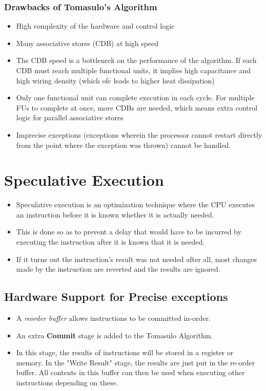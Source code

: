 \documentclass{article}
\begin{document}
\subsubsection{Drawbacks of Tomasulo's Algorithm}
\begin{itemize}
    \item High complexity of the hardware and control logic
    
    \item Many associative stores (CDB) at high speed
    
    \item The CDB speed is a bottleneck on the performance of the algorithm. If each CDB must reach multiple functional units, it implies high capacitance and high wiring density (which ofc leads to higher heat dissipation)
    
    \item Only one functional unit can complete execution in each cycle. For multiple FUs to complete at once, more CDBs are needed, which means extra control logic for parallel associative stores
    
    \item Imprecise exceptions (exceptions wherein the processor cannot restart directly from the point where the exception was thrown) cannot be handled.
\end{itemize}

\section{Speculative Execution}
\begin{itemize}
    \item Speculative execution is an optimization technique where the CPU executes an instruction before it is known whether it is actually needed.
    
    \item This is done so as to prevent a delay that would have to be incurred by executing the instruction after it is known that it is needed. 
    
    \item If it turns out the instruction's result was not needed after all, most changes made by the instruction are reverted and the results are ignored.
\end{itemize}
\subsection{Hardware Support for Precise exceptions}
\begin{itemize}
    \item A \textit{reorder buffer} allows instructions to be committed in-order.
    
    \item An extra \textbf{Commit} stage is added to the Tomasulo Algorithm. 
    
    \item  In this stage, the results of instructions will be stored in a register or memory. In the "Write Result" stage, the results are just put in the re-order buffer. All contents in this buffer can then be used when executing other instructions depending on these.
\end{itemize}
\end{document}
